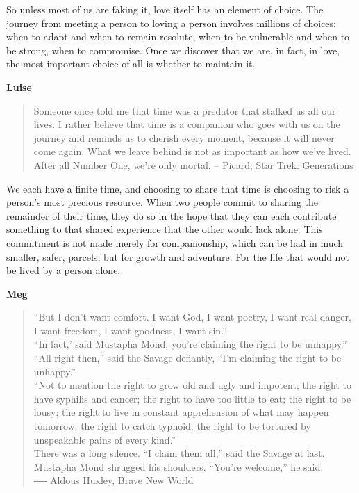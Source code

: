 \documentclass[twoside]{article}
\begin{document}
So unless most of us are faking it, love itself has an element of choice. The journey from meeting a person to loving a person involves millions of choices: when to adapt and when to remain resolute, when to be vulnerable and when to be strong, when to compromise. Once we discover that we are, in fact, in love, the most important choice of all is whether to maintain it. 
	
        \begin{center}
          \textbf{Luise}
        \end{center}
        \begin{quote}
          Someone once told me that time was a predator that stalked us all our lives. I rather believe that time is a companion who goes with us on the journey and reminds us to cherish every moment, because it will never come again. What we leave behind is not as important as how we've lived. After all Number One, we're only mortal. 
          -- Picard; Star Trek: Generations
        \end{quote}
        
We each have a finite time, and choosing to share that time is choosing to risk a person’s most precious resource. When two people commit to sharing the remainder of their time, they do so in the hope that they can each contribute something to that shared experience that the other would lack alone. This commitment is not made merely for companionship, which can be had in much smaller, safer, parcels, but for growth and adventure. For the life that would not be lived by a person alone. 

        \begin{center}
          \textbf{Meg}
        \end{center}
        \begin{quote}
          ``But I don't want comfort. I want God, I want poetry, I want real danger, I want freedom, I want goodness, I want sin.''
          \\
          ``In fact,' said Mustapha Mond, you're claiming the right to be unhappy.''
          \\
          ``All right then,'' said the Savage defiantly, ``I'm claiming the right to be unhappy.'' 
          \\
          ``Not to mention the right to grow old and ugly and impotent; the right to have syphilis and cancer; the right to have too little to eat; the right to be lousy; the right to live in constant apprehension of what may happen tomorrow; the right to catch typhoid; the right to be tortured by unspeakable pains of every kind.'' 
          \\
          There was a long silence. ``I claim them all,'' said the Savage at last.
          \\
          Mustapha Mond shrugged his shoulders. ``You're welcome,'' he said.
          \\
          -― Aldous Huxley, Brave New World
        \end{quote}
        
\end{document}
